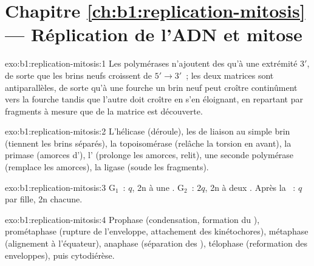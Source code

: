 \section*{Chapitre \ref{ch:b1:replication-mitosis} --- Réplication de l'ADN et mitose}

\begin{solution}{exo:b1:replication-mitosis:1}
Les polymérases n'ajoutent des  qu'à une extrémité $3'$, de
sorte que les brins neufs croissent de $5' \to 3'$~; les deux matrices
sont antiparallèles, de sorte qu'à une fourche un brin neuf peut croître
continûment vers la fourche tandis que l'autre doit croître en s'en
éloignant, en repartant par fragments à mesure que de la matrice est
découverte.
\end{solution}

\begin{solution}{exo:b1:replication-mitosis:2}
L'hélicase (déroule), les  de liaison au simple brin (tiennent
les brins séparés), la topoisomérase (relâche la torsion en avant), la
primase (amorces d'), l' (prolonge les amorces, relit),
une seconde polymérase (remplace les amorces), la ligase (soude les
fragments).
\end{solution}

\begin{solution}{exo:b1:replication-mitosis:3}
G$_1$~: $q$, 2n  à une . G$_2$~: $2q$, 2n
 à deux . Après la ~: $q$ par 
fille, 2n  chacune.
\end{solution}

\begin{solution}{exo:b1:replication-mitosis:4}
Prophase (condensation, formation du ), prométaphase (rupture de
l'enveloppe, attachement des kinétochores), métaphase (alignement à
l'équateur), anaphase (séparation des ), télophase
(reformation des enveloppes), puis cytodiérèse.
\end{solution}

